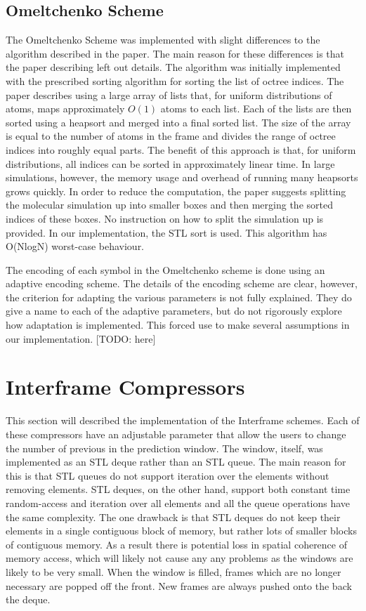 \documentclass[a4paper,11pt]{report}
\begin{document}
\subsection{Omeltchenko Scheme}

\label{imp_omelt}
The Omeltchenko Scheme was implemented with slight differences to the algorithm described in the paper. The main reason for these differences is that the paper describing left out details. The algorithm was initially implemented with the prescribed sorting algorithm for sorting the list of octree indices. The paper describes using a large array of lists that, for uniform distributions of atoms, maps approximately $O(1)$ atoms to each list. Each of the lists are then sorted using a heapsort and merged into a final sorted list. The size of the array is equal to the number of atoms in the frame and divides the range of octree indices into roughly equal parts. The benefit of this approach is that, for uniform distributions, all indices can be sorted in approximately linear time.  In large simulations, however, the memory usage and overhead of running many heapsorts grows quickly. In order to reduce the computation, the paper suggests splitting the molecular simulation up into smaller boxes and then merging the sorted indices of these boxes. No instruction on how to split the simulation up is provided. In our implementation, the STL sort is used. This algorithm has O(NlogN) worst-case behaviour.

The encoding of each symbol in the Omeltchenko scheme is done using an adaptive encoding scheme. The details of the encoding scheme are clear, however, the criterion for adapting the various parameters is not fully explained. They do give a name to each of the adaptive parameters, but do not rigorously explore how adaptation is implemented. This forced use to make several assumptions in our implementation. [TODO: here]

\section{Interframe Compressors}

This section will described the implementation of the Interframe schemes. Each of these compressors have an adjustable parameter that allow the users to change the number of previous in the prediction window. The window, itself, was implemented as an STL deque rather than an STL queue. The main reason for this is that STL queues do not support iteration over the elements without removing elements. STL deques, on the other hand, support both constant time random-access and iteration over all elements and all the queue operations have the same complexity. The one drawback is that STL deques do not keep their elements in a single contiguous block of memory, but rather lots of smaller blocks of contiguous memory. As a result there is potential loss in spatial coherence of memory access, which will likely not cause any any problems as the windows are likely to be very small. When the window is filled, frames which are no longer necessary are popped off the front. New frames are always pushed onto the back the deque.
\end{document}
